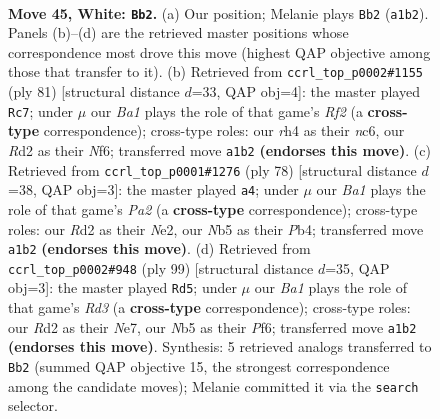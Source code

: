\documentclass[11pt]{article}
\begin{document}
\clearpage

\begin{figure}[p]\centering
\begin{subfigure}{0.46\textwidth}\centering
\resizebox{\linewidth}{!}{%
\newchessgame
\chessboard[
  setfen={8/1p2pk1p/n5p1/pN6/2p4r/2P2P2/P2R1K2/B7 w - - 0 45},
  showmover=false,
  pgfstyle=straightmove, color=movearrow, markmove={a1-b2}
]}
\caption{}
\end{subfigure}\hfill
\begin{subfigure}{0.46\textwidth}\centering
\resizebox{\linewidth}{!}{%
\newchessgame
\chessboard[
  setfen={8/5rpk/p1N2n2/2p4p/2P5/P2R2PP/6K1/8 b - - 0 41},
  showmover=false,
  pgfstyle=straightmove, color=movearrow, markmove={f7-c7}
]}
\caption{}
\end{subfigure}
\\[4pt]
\begin{subfigure}{0.46\textwidth}\centering
\resizebox{\linewidth}{!}{%
\newchessgame
\chessboard[
  setfen={7R/pp6/2pknrp1/8/1P4PP/2P1p1K1/P3N3/8 w - - 2 40},
  showmover=false,
  pgfstyle=straightmove, color=movearrow, markmove={a2-a4}
]}
\caption{}
\end{subfigure}\hfill
\begin{subfigure}{0.46\textwidth}\centering
\resizebox{\linewidth}{!}{%
\newchessgame
\chessboard[
  setfen={6k1/4n1p1/3rpp1p/p7/R6P/1P2PNP1/P5K1/8 b - - 0 50},
  showmover=false,
  pgfstyle=straightmove, color=movearrow, markmove={d6-d5}
]}
\caption{}
\end{subfigure}
\caption{\textbf{Move 45, White: \texttt{Bb2}.} (a) Our position; Melanie plays \texttt{Bb2} (\texttt{a1b2}). Panels (b)--(d) are the retrieved master positions whose correspondence most drove this move (highest QAP objective among those that transfer to it). (b) Retrieved from \texttt{ccrl\_top\_p0002\#1155} (ply 81) [structural distance $d$=33, QAP obj=4]: the master played \texttt{Rc7}; under $\mu$ our \emph{Ba1} plays the role of that game's \emph{Rf2} (a \textbf{cross-type} correspondence); cross-type roles: our \emph{r}h4 as their \emph{n}c6, our \emph{R}d2 as their \emph{N}f6; transferred move \texttt{a1b2} \textbf{(endorses this move)}. (c) Retrieved from \texttt{ccrl\_top\_p0001\#1276} (ply 78) [structural distance $d$=38, QAP obj=3]: the master played \texttt{a4}; under $\mu$ our \emph{Ba1} plays the role of that game's \emph{Pa2} (a \textbf{cross-type} correspondence); cross-type roles: our \emph{R}d2 as their \emph{N}e2, our \emph{N}b5 as their \emph{P}b4; transferred move \texttt{a1b2} \textbf{(endorses this move)}. (d) Retrieved from \texttt{ccrl\_top\_p0002\#948} (ply 99) [structural distance $d$=35, QAP obj=3]: the master played \texttt{Rd5}; under $\mu$ our \emph{Ba1} plays the role of that game's \emph{Rd3} (a \textbf{cross-type} correspondence); cross-type roles: our \emph{R}d2 as their \emph{N}e7, our \emph{N}b5 as their \emph{P}f6; transferred move \texttt{a1b2} \textbf{(endorses this move)}. Synthesis: 5 retrieved analogs transferred to \texttt{Bb2} (summed QAP objective 15, the strongest correspondence among the candidate moves); Melanie committed it via the \texttt{search} selector.}
\label{fig:thought-m88}
\end{figure}
\end{document}
